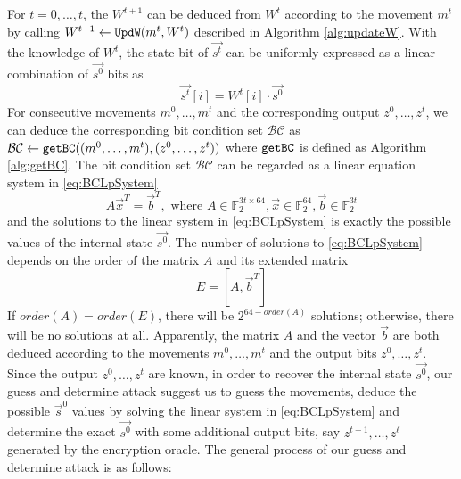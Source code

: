 For $t=0,\ldots, t$, the $W^{t+1}$ can be deduced from $W^t$ according to the movement $m^t$ by calling
$W^{t+1}\leftarrow {\tt UpdW}(m^t, W^t)$ described in Algorithm \ref{alg:updateW}.
With the knowledge of $W^t$, the state bit of $\vec{s^t}$ can be uniformly expressed as a linear combination of $\vec{s^0}$ bits as
\begin{equation}\label{eq:ExpressStwithS0}
\vec{s^t}[i]=W^t[i]\cdot \vec{s^0}
\end{equation}
For consecutive movements $m^0,\ldots,m^t$ and the corresponding output $z^0,\ldots, z^t$, we can deduce the corresponding bit condition set $\mathcal{BC}$ as $\mathcal{BC}\leftarrow {\tt{getBC}}((m^0,\ldots, m^t), (z^0,\ldots, z^t))$ where ${\tt{getBC}}$ is defined as Algorithm \ref{alg:getBC}.
The bit condition set $\mathcal{BC}$ can be regarded as a linear equation system in \eqref{eq:BCLpSystem}
\begin{equation}\label{eq:BCLpSystem}
  A\vec x^T=\vec b^T, \text{ where } A\in \mathbb{F}_2^{3t\times 64}, \vec x\in \mathbb{F}_2^{64}, \vec b\in \mathbb{F}_2^{3t}
\end{equation}
and the solutions to the linear system in \eqref{eq:BCLpSystem} is exactly the possible values of the internal state $\vec{s^0}$.
The number of solutions to \eqref{eq:BCLpSystem} depends on the order of the matrix $A$ and its extended matrix
\begin{equation}\label{eq:ExtendedMatrixOfA}
  E=[A,\vec b^T]
\end{equation}
If $order(A)=order(E)$, there will be $2^{64-order(A)}$ solutions; otherwise, there will be no solutions at all.
Apparently, the matrix $A$ and the vector $\vec b$ are both deduced according to the movements $m^0,\ldots, m^t$ and the output bits $z^0,\ldots, z^t$.
Since the output $z^0,\ldots, z^t$ are known, in order to recover the internal state $\vec{s^0}$, our guess and determine attack suggest us to guess the movements, deduce the possible $\vec s^0$ values by solving the linear system in \eqref{eq:BCLpSystem} and determine the exact $\vec{s^0}$ with some additional output bits, say $z^{t+1},\ldots, z^{\ell}$ generated by the encryption oracle.
The general process of our guess and determine attack is as follows:
